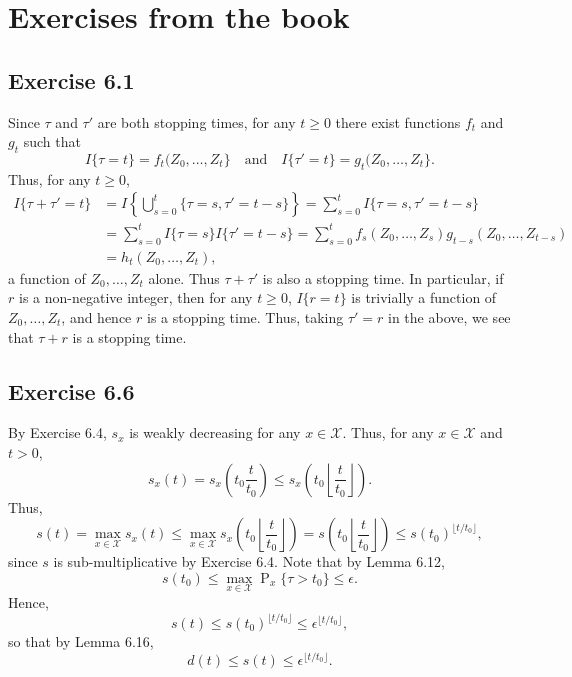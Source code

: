 \documentclass[12pt]{article}
\DeclareMathOperator{\Prob}{P}
\begin{document}
\section*{Exercises from the book}

\subsection*{Exercise 6.1}

Since $\tau$ and $\tau'$ are both stopping times, for any $t \geq 0$ there exist functions $f_t$ and $g_t$ such that
\begin{equation*}
I\{\tau = t\} = f_t(Z_0, \ldots, Z_t\} \quad \text{and} \quad I\{\tau' = t\} = g_t(Z_0, \ldots, Z_t\}.
\end{equation*}
Thus, for any $t \geq 0$,
\begin{align*}
I\{\tau + \tau' = t\} &= I\left\{\bigcup_{s=0}^t \{\tau = s, \tau' = t-s\} \right\} = \sum_{s=0}^t I\{\tau = s, \tau' = t-s\} \\
&= \sum_{s=0}^t I\{\tau = s\} I\{\tau' = t-s\} = \sum_{s=0}^t f_s(Z_0, \ldots, Z_s) g_{t-s}(Z_0, \ldots, Z_{t-s}) \\
&= h_t(Z_0, \ldots, Z_t),
\end{align*}
a function of $Z_0, \ldots, Z_t$ alone. Thus $\tau + \tau'$ is also a stopping time. In particular, if $r$ is a non-negative integer, then for any $t \geq 0$, $I\{r = t\}$ is trivially a function of $Z_0, \ldots, Z_t$, and hence $r$ is a stopping time. Thus, taking $\tau' = r$ in the above, we see that $\tau + r$ is a stopping time.

\subsection*{Exercise 6.6}

By Exercise 6.4, $s_x$ is weakly decreasing for any $x \in \mathcal{X}$. Thus, for any $x \in \mathcal{X}$ and $t > 0$,
\begin{equation*}
s_x(t) = s_x\left(t_0 \frac{t}{t_0}\right) \leq s_x\left(t_0 \left\lfloor \frac{t}{t_0} \right\rfloor \right).
\end{equation*}
Thus,
\begin{equation*}
s(t) = \max_{x \in \mathcal{X}} s_x(t) \leq \max_{x \in \mathcal{X}} s_x\left(t_0 \left\lfloor \frac{t}{t_0} \right\rfloor \right) = s\left(t_0 \left\lfloor \frac{t}{t_0} \right\rfloor \right) \leq s(t_0)^{\lfloor t / t_0 \rfloor},
\end{equation*}
since $s$ is sub-multiplicative by Exercise 6.4. Note that by Lemma 6.12,
\begin{equation*}
s(t_0) \leq \max_{x \in \mathcal{X}} \Prob_x\{\tau > t_0\} \leq \epsilon.
\end{equation*}
Hence,
\begin{equation*}
s(t) \leq s(t_0)^{\lfloor t / t_0 \rfloor} \leq \epsilon^{\lfloor t / t_0 \rfloor},
\end{equation*}
so that by Lemma 6.16,
\begin{equation*}
d(t) \leq s(t) \leq \epsilon^{\lfloor t / t_0 \rfloor}.
\end{equation*}
\end{document}
